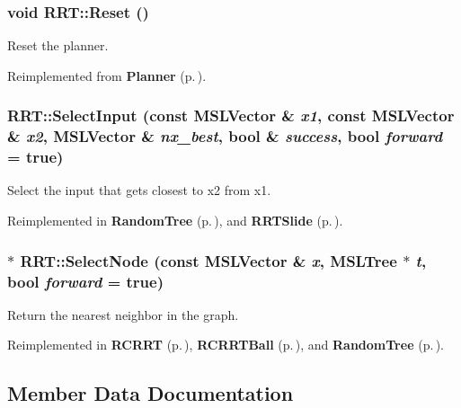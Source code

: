 \subsubsection{\setlength{\rightskip}{0pt plus 5cm}void RRT::Reset ()\hspace{0.3cm}{\tt  [virtual]}}\label{classRRT_a2}


Reset the planner.



Reimplemented from {\bf Planner} {\rm (p.\,\pageref{classPlanner_a2})}.
\subsubsection{ RRT::Select\-Input (const {\bf MSLVector} \& {\em x1}, const {\bf MSLVector} \& {\em x2}, {\bf MSLVector} \& {\em nx\_\-best}, bool \& {\em success}, bool {\em forward} = true)\hspace{0.3cm}{\tt  [protected, virtual]}}\label{classRRT_b0}


Select the input that gets closest to x2 from x1.



Reimplemented in {\bf Random\-Tree} {\rm (p.\,\pageref{classRandomTree_b1})}, and {\bf RRTSlide} {\rm (p.\,\pageref{classRRTSlide_a2})}.
\subsubsection{ $\ast$ RRT::Select\-Node (const {\bf MSLVector} \& {\em x}, {\bf MSLTree} $\ast$ {\em t}, bool {\em forward} = true)\hspace{0.3cm}{\tt  [protected, virtual]}}\label{classRRT_b1}


Return the nearest neighbor in the graph.



Reimplemented in {\bf RCRRT} {\rm (p.\,\pageref{classRCRRT_a6})}, {\bf RCRRTBall} {\rm (p.\,\pageref{classRCRRTBall_a2})}, and {\bf Random\-Tree} {\rm (p.\,\pageref{classRandomTree_b0})}.

\subsection{Member Data Documentation}
